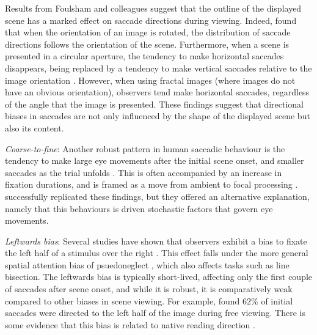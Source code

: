 Results from Foulsham and colleagues suggest that the outline of the displayed scene has a marked effect on saccade directions during viewing. Indeed, \cite{foulsham2008} found that when the orientation of an image is rotated, the distribution of saccade directions follows the orientation of the scene. Furthermore, when a scene is presented in a circular aperture, the tendency to make horizontal saccades disappears, being replaced by a tendency to make vertical saccades relative to the image orientation \citep{foulsham-kingstone2010}. However, when using fractal images (where images do not have an obvious orientation), observers tend make horizontal saccades, regardless of the angle that the image is presented. These findings suggest that directional biases in saccades are not only influenced by the shape of the displayed scene but also its content.

\textit{Coarse-to-fine}: Another robust pattern in human saccadic behaviour is the tendency to make large eye movements after the initial scene onset, and smaller saccades as the trial unfolds \citep{over2007, pannasch2008,antes1974}. This is often accompanied by an increase in fixation durations,  and is framed as a move from ambient to focal processing \citep{follet2011,velichkovsky2002,unema2005}. \cite{godwin2014} successfully replicated these findings, but they offered an alternative explanation, namely that this behaviours is driven stochastic factors that govern eye movements.


\textit{Leftwards bias}: Several studies have shown that observers exhibit a bias to fixate the left half of a stimulus over the right \citep{ossandon2014,nuthmann-matthias2014,learmonth2015,zelinsky1996, brandt1945}. This effect falls under the more general spatial attention bias of psuedoneglect \citep{bowers-heilman1980}, which also affects tasks such as line bisection. The leftwards bias is typically short-lived, affecting only the first couple of saccades after scene onset, and while it is robust, it is comparatively weak compared to other biases in scene viewing. For example,  \cite{dickinson-intraub2009} found $62\%$ of initial saccades were directed to the left half of the image during free viewing. There is some evidence that this bias is related to native reading direction \citep{friedrich2014}.

